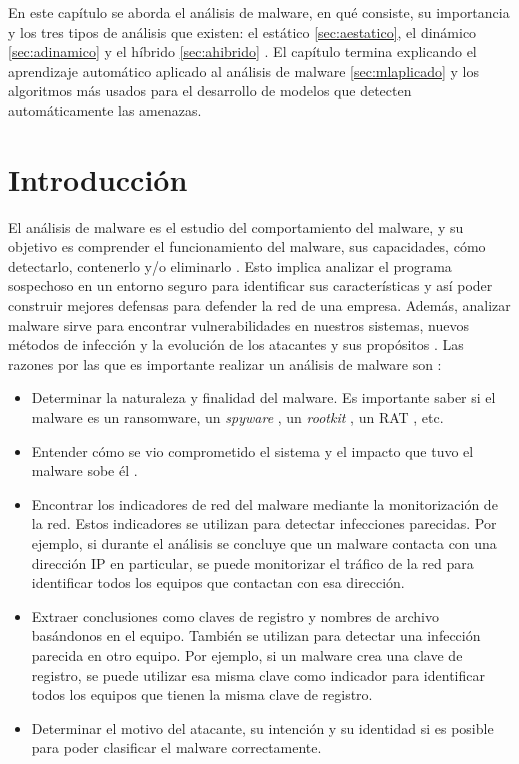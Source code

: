 
\noindent En este capítulo se aborda el análisis de malware, en qué consiste, su importancia y los tres tipos de análisis que existen: el estático \ref{sec:aestatico}, el dinámico \ref{sec:adinamico} y el híbrido \ref{sec:ahibrido} . El capítulo termina explicando el aprendizaje automático aplicado al análisis de malware \ref{sec:mlaplicado} y los algoritmos más usados para el desarrollo de modelos que detecten automáticamente las amenazas. 



\section{Introducción}

\noindent El análisis de malware es el estudio del comportamiento del malware, y su objetivo es comprender el funcionamiento del malware, sus capacidades, cómo detectarlo, contenerlo y/o eliminarlo \cite{113}. Esto implica analizar el programa sospechoso en un entorno seguro para identificar sus características y así poder construir mejores defensas para defender la red de una empresa. Además, analizar malware sirve para encontrar vulnerabilidades en nuestros sistemas, nuevos métodos de infección y la evolución de los atacantes y sus propósitos \cite{LMA2018}.
Las razones por las que es importante realizar un análisis de malware son \cite{75}:
\begin{itemize}
\item Determinar la naturaleza y finalidad del malware. Es importante saber si el malware es un ransomware, un \textit{spyware} \cite{114}, un \textit{rootkit} \cite{115}, un \gls{RAT} \cite{116}, etc.
\item Entender cómo se vio comprometido el sistema y el impacto que tuvo el malware sobe él \cite{118}.
\item Encontrar los indicadores de red del malware mediante la monitorización de la red. Estos indicadores se utilizan para detectar infecciones parecidas. Por ejemplo, si durante el análisis se concluye que un malware contacta con una dirección \gls{IP} en particular, se puede monitorizar el tráfico de la red para identificar todos los equipos que contactan con esa dirección.
\item Extraer conclusiones como claves de registro y nombres de archivo basándonos en el equipo. También se utilizan para detectar una infección parecida en otro equipo. Por ejemplo, si un malware crea una clave de registro, se puede utilizar esa misma clave como indicador para identificar todos los equipos que tienen la misma clave de registro.
\item Determinar el motivo del atacante, su intención y su identidad si es posible para poder clasificar el malware correctamente. 
\end{itemize}

